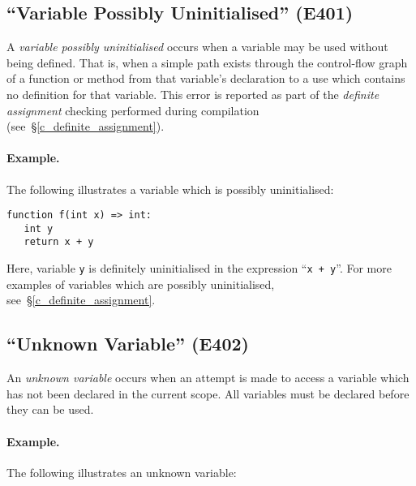 

\subsection{``Variable Possibly Uninitialised'' (E401)}
\label{c_err_var_uninitialised}
A {\em variable possibly uninitialised} occurs when a variable may be used without being defined.  That is, when a simple path exists through the control-flow graph of a function or method from that variable's declaration to a use which contains no definition for that variable.  This error is reported as part of the {\em definite assignment} checking performed during compilation (see~\S\ref{c_definite_assignment}).

\paragraph{Example.}  The following illustrates a variable which is possibly uninitialised:

\begin{lstlisting}
function f(int x) => int:
   int y
   return x + y
\end{lstlisting}

Here, variable \lstinline{y} is definitely uninitialised in the expression ``\lstinline{x + y}''.  For more examples of variables which are possibly uninitialised, see~\S\ref{c_definite_assignment}.

\subsection{``Unknown Variable'' (E402)}

An {\em unknown variable} occurs when an attempt is made to access a variable which has not been declared in the current scope.  All variables must be declared before they can be used.

\paragraph{Example.}  The following illustrates an unknown variable:

